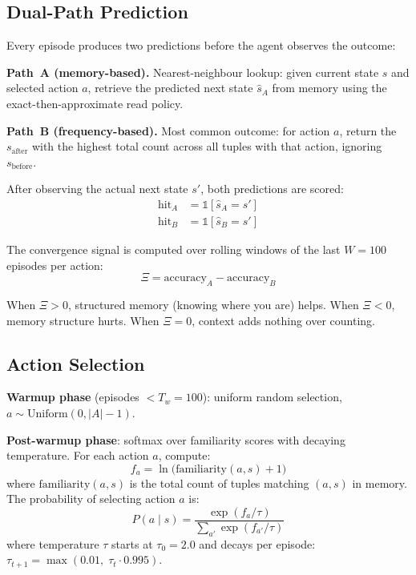 \documentclass[11pt,a4paper]{article}
\begin{document}
\subsection{Dual-Path Prediction}

Every episode produces two predictions before the agent observes the outcome:

\textbf{Path~A (memory-based).} Nearest-neighbour lookup: given current state $s$ and selected action $a$, retrieve the predicted next state $\hat{s}_A$ from memory using the exact-then-approximate read policy.

\textbf{Path~B (frequency-based).} Most common outcome: for action $a$, return the $s_\text{after}$ with the highest total count across all tuples with that action, ignoring $s_\text{before}$.

After observing the actual next state $s'$, both predictions are scored:
\begin{align}
    \text{hit}_A &= \mathbb{1}[\hat{s}_A = s'] \\
    \text{hit}_B &= \mathbb{1}[\hat{s}_B = s']
\end{align}

The convergence signal is computed over rolling windows of the last $W = 100$ episodes per action:
\begin{equation}
    \Xi = \text{accuracy}_A - \text{accuracy}_B
    \label{eq:xi}
\end{equation}

When $\Xi > 0$, structured memory (knowing where you are) helps. When $\Xi < 0$, memory structure hurts. When $\Xi = 0$, context adds nothing over counting.

\subsection{Action Selection}

\textbf{Warmup phase} (episodes $< T_w = 100$): uniform random selection, $a \sim \text{Uniform}(0, |A|-1)$.

\textbf{Post-warmup phase}: softmax over familiarity scores with decaying temperature. For each action $a$, compute:
\begin{equation}
    f_a = \ln\!\big(\text{familiarity}(a, s) + 1\big)
\end{equation}
where $\text{familiarity}(a, s)$ is the total count of tuples matching $(a, s)$ in memory. The probability of selecting action $a$ is:
\begin{equation}
    P(a \mid s) = \frac{\exp(f_a / \tau)}{\sum_{a'} \exp(f_{a'} / \tau)}
    \label{eq:softmax}
\end{equation}
where temperature $\tau$ starts at $\tau_0 = 2.0$ and decays per episode: $\tau_{t+1} = \max(0.01,\; \tau_t \cdot 0.995)$.
\end{document}
